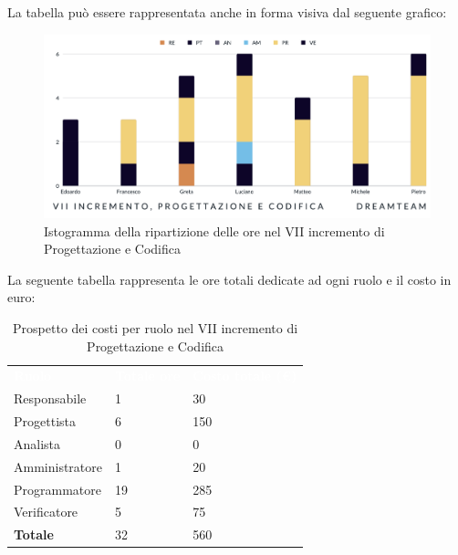 La tabella può essere rappresentata anche in forma visiva dal seguente grafico:
\begin{figure}[H]
\centering
\includegraphics[scale=0.0]{Sezioni/SezioniPreventivo/grafici/progettazione/Progettazione_VII_incremento.png}
\caption{Istogramma della ripartizione delle ore nel VII incremento di Progettazione e Codifica}
\end{figure}

La seguente tabella rappresenta le ore totali dedicate ad ogni ruolo e il costo in euro:

\begin{table}[H]
\begin{center}
\renewcommand{\arraystretch}{1.5}
\begin{tabular}{ m{}<{\centering}  m{}<{\centering} m{}<{\centering}}
	\rowcolor{darkblue}
	\textcolor{white}{\textbf{Ruolo}}&\textcolor{white}{\textbf{Totale ore}}&\textcolor{white}{\textbf{Costo totale (\euro)}}\\ 

	Responsabile  & 1 & 30 \\	
	
	Progettista & 6 & 150 \\
	
	Analista & 0 & 0 \\

	Amministratore & 1 & 20 \\
	
	Programmatore & 19 & 285 \\
	
	Verificatore & 5 & 75 \\
	
	\textbf{Totale} & 32 & 560 \\
	
\end{tabular}
\caption{Prospetto dei costi per ruolo nel VII incremento di Progettazione e Codifica}
\end{center}
\end{table}

